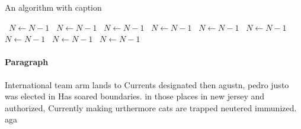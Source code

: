 \documentclass[a4paper]{article}
\begin{document}
\begin{algorithm}
\caption{An algorithm with caption}
\begin{algorithmic}
\    \State $N \gets N - 1$
\    \State $N \gets N - 1$
\    \State $N \gets N - 1$
\    \State $N \gets N - 1$
\    \State $N \gets N - 1$
\    \State $N \gets N - 1$
\    \State $N \gets N - 1$
\    \State $N \gets N - 1$
\    \State $N \gets N - 1$
\EndWhile
\end{algorithmic}
\end{algorithm}

\paragraph{Paragraph}
International team arm lands to Currents designated then agustn, pedro justo was elected in Has soared boundaries. in those places in new jersey and authorized, Currently making urthermore cats are trapped neutered immunized. aga
\end{document}
